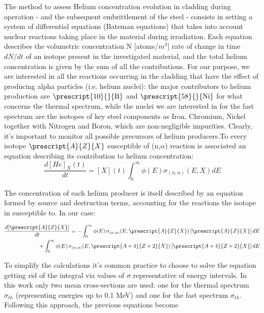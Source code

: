 

\maketitle


The method to assess Helium concentration evolution in cladding during operation - and the subsequent embrittlement of the steel -
consists in setting a system of differential equations (Bateman equations) that takes into account nuclear reactions taking place 
in the material during irradiation. Each equation describes the volumetric concentration N [atoms/\(m^3\)] rate of change in time \(dN/dt\) of 
an isotope present in the investigated material, and the total helium concentration is given by the sum of all the contributions. 
For our purpose, we are interested in all the reactions occurring in the cladding that have the effect of producing alpha particles 
(i.e. helium nuclei): the major contributors to helium production are \(\prescript{10}{}{\text{B}}\) and \(\prescript{58}{}{\text{Ni}}\) for what
concerns the thermal spectrum, while the nuclei we are interested in for the fast spectrum are the isotopes of key steel components as 
Iron, Chromium, Nickel together with Nitrogen and Boron, which are non-negligible impurities. Clearly, it's important to monitor all possible
precursors of helium producers.To every isotope \(\prescript{A}{Z}{X}\) susceptible of (n,\(\alpha\)) reaction is associated an equation describing its contribution to helium concentration: 
\[ \frac{d[He]_X(t)}{dt} = [X](t) \int_0^{\infty} \phi(E) \sigma_{(n,\alpha)}(E,X)dE \]

The concentration of each helium producer is itself described by an equation formed by source and destruction terms, accounting for the reactions the isotope in susceptible to. In our case: 

\begin{align}
\frac{d[\prescript{A}{Z}{X}]}{dt} = - \int_0^{\infty}\phi(E)\,\sigma_{(n,\alpha)}(E,\prescript{A}{Z}{X})\,[\prescript{A}{Z}{X}]\,dE \\
+ \int_0^{\infty}\phi(E)\,\sigma_{(n,\alpha)}(E,\prescript{A+4}{Z+2}{X})\,[\prescript{A+4}{Z+2}{X}]\,dE
\end{align}

To simplify the calculations it's common practice to choose to solve the equation getting rid of the integral via values of \(\sigma\) 
representative of energy intervals. In this work only two mean cross-sections are used: one for the thermal spectrum \(\sigma_{th}\) (representing energies up to 0.1 MeV) and one for the fast spectrum \(\sigma_{th}\). Following this approach, the previous equations become 

